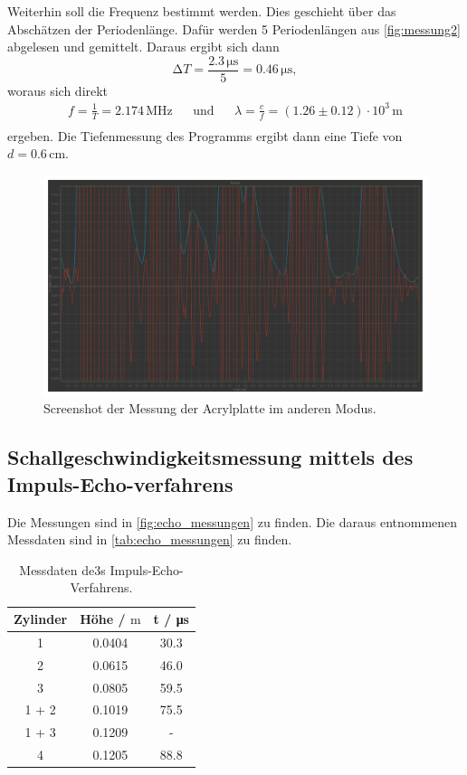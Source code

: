 Weiterhin soll die Frequenz bestimmt werden.
Dies geschieht über das Abschätzen der Periodenlänge.
Dafür werden 5 Periodenlängen aus \autoref{fig:messung2} abgelesen und gemittelt.
Daraus ergibt sich dann
\begin{equation*}
  \increment T = \frac{2.3 \, \unit{\micro\second}}{5} = 0.46 \, \unit{\micro\second},
\end{equation*}
woraus sich direkt
\begin{align*}
  f = \frac{1}{T} = 2.174 \, \unit{\mega\hertz} && \text{und} && \lambda = \frac{c}{f} = (1.26 \pm 0.12) \cdot 10^3 \, \unit\meter\\
\end{align*}
ergeben.
Die Tiefenmessung des Programms ergibt dann eine Tiefe von $d = 0.6 \, \unit{\centi\meter}$.


\begin{figure} [H]
  \centering
  \includegraphics[width =\linewidth]{pictures/Schallgeschwindigkeit/Messung2.pdf}
  \caption{Screenshot der Messung der Acrylplatte im anderen Modus.}
  \label{fig:messung2}
\end{figure}


\subsection{Schallgeschwindigkeitsmessung mittels des Impuls-Echo-verfahrens}

Die Messungen sind in \autoref{fig:echo_messungen} zu finden.
Die daraus entnommenen Messdaten sind in \autoref{tab:echo_messungen} zu finden.

\begin{table}
  \centering
  \caption{Messdaten de3s Impuls-Echo-Verfahrens.}
  \label{tab:echo_messungen}
  \begin{tabular}{c | c c}
      \toprule
      Zylinder& Höhe / $\unit\meter$ & t / \unit{\micro\second}\\ 
      \midrule
      1     & 0.0404 & 30.3 \\
      2     & 0.0615 & 46.0 \\
      3     & 0.0805 & 59.5 \\
      1 + 2 & 0.1019 & 75.5 \\
      1 + 3 & 0.1209 &  -   \\
      4     & 0.1205 & 88.8 \\
      \bottomrule
  \end{tabular}
\end{table}



